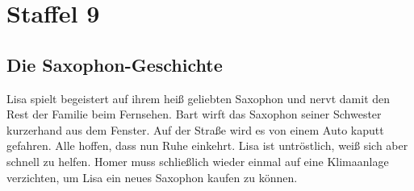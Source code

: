 \section{Staffel 9}

\subsection{Die Saxophon-Geschichte}\label{3G02}
Lisa spielt begeistert auf ihrem heiß geliebten Saxophon und nervt damit den Rest der Familie beim Fernsehen. Bart wirft das Saxophon seiner Schwester kurzerhand aus dem Fenster. Auf der Straße wird es von einem Auto kaputt gefahren. Alle hoffen, dass nun Ruhe einkehrt. Lisa ist untröstlich, weiß sich aber schnell zu helfen. Homer muss schließlich wieder einmal auf eine Klimaanlage verzichten, um Lisa ein neues Saxophon kaufen zu können.

